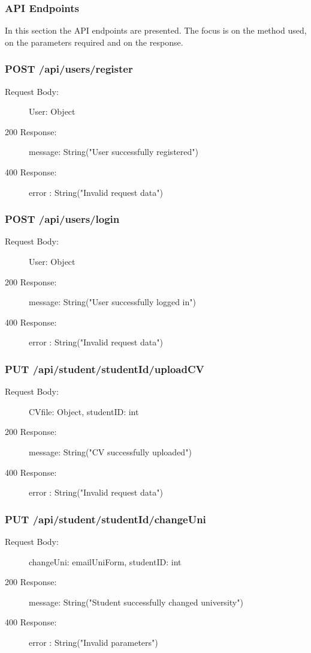 \documentclass[a4paper,12pt]{article}
\begin{document}
\newpage
\subsubsection{API Endpoints}
In this section the API endpoints are presented. The focus is on the method used, on the parameters required and on the response.


\subsubsection*{POST /api/users/register}
\begin{description}
    \item[Request Body:]  User: Object
    \item[200 Response:] message: String("User successfully registered") 
    \item[400 Response:] error : String("Invalid request data")
\end{description}

\subsubsection*{POST /api/users/login}
\begin{description}
    \item[Request Body:]  User: Object
    \item[200 Response:] message: String("User successfully logged in") 
    \item[400 Response:] error : String("Invalid request data")
\end{description}

\subsubsection*{PUT /api/student/{studentId}/uploadCV}
\begin{description}
    \item[Request Body:]  CVfile: Object, studentID: int
    \item[200 Response:] message: String("CV successfully uploaded") 
    \item[400 Response:] error : String("Invalid request data")
\end{description}

\subsubsection*{PUT /api/student/{studentId}/changeUni}
\begin{description}
    \item[Request Body:]  changeUni: emailUniForm, studentID: int
    \item[200 Response:] message: String("Student successfully changed university") 
    \item[400 Response:] error : String("Invalid parameters")
\end{description}
\end{document}
